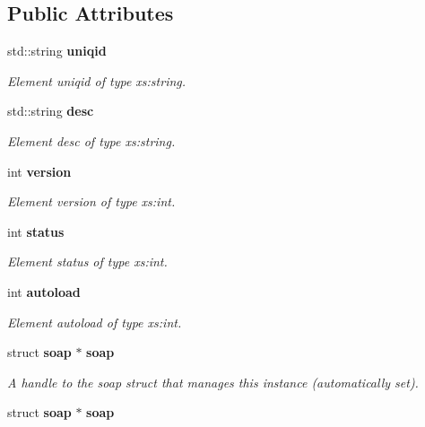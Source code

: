 \subsection*{Public Attributes}
\begin{CompactItemize}
\item 
std::string {\bf uniqid}
\begin{CompactList}\small\item\em Element uniqid of type xs:string. \item\end{CompactList}\item 
std::string {\bf desc}
\begin{CompactList}\small\item\em Element desc of type xs:string. \item\end{CompactList}\item 
int {\bf version}
\begin{CompactList}\small\item\em Element version of type xs:int. \item\end{CompactList}\item 
int {\bf status}
\begin{CompactList}\small\item\em Element status of type xs:int. \item\end{CompactList}\item 
int {\bf autoload}
\begin{CompactList}\small\item\em Element autoload of type xs:int. \item\end{CompactList}\item 
struct {\bf soap} $\ast$ {\bf soap}\label{classns2____PluginData_9ff255f10f377c0770ac5844fedfa148}

\begin{CompactList}\small\item\em A handle to the soap struct that manages this instance (automatically set). \item\end{CompactList}\item 
struct {\bf soap} $\ast$ \textbf{soap}\label{classns2____PluginData_9ff255f10f377c0770ac5844fedfa148}

\end{CompactItemize}


